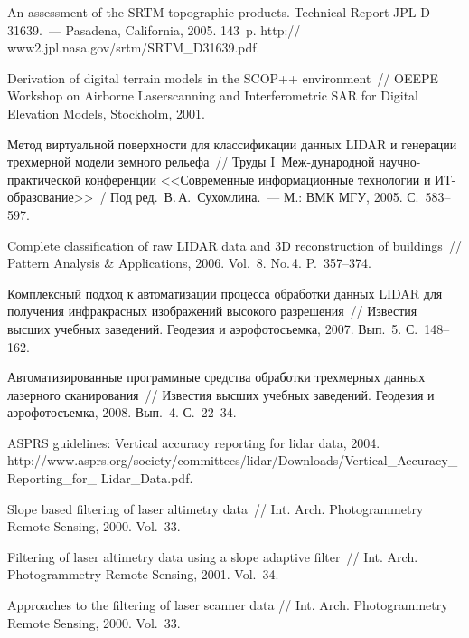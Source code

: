 \begin{multicols}{2}
{{\begin{thebibliography}{99}
An assessment of the SRTM topographic products. Technical Report JPL D-31639.~--- Pasadena, 
California, 2005. 143~p. {\sf http:// www2.jpl.nasa.gov/srtm/SRTM\_D31639.pdf}.

Derivation of digital terrain models in the SCOP++ environment~// OEEPE Workshop on 
Airborne Laserscanning and Interferometric SAR for Digital Elevation Models, Stockholm, 2001.

Метод виртуальной поверхности для классификации данных LIDAR и генерации 
трехмерной модели земного рельефа~// Труды I~Меж-\linebreak дународной 
научно-практической конференции <<Современные информационные технологии и 
ИТ-об\-ра\-зо\-вание>>~/ Под ред.\ В.\,А.~Сухомлина.~--- М.: ВМК МГУ, 2005. С.~583--597.

Complete classification of raw LIDAR data and 3D reconstruction of buildings~// Pattern 
Analysis \& Applications, 2006. Vol.~8. No.\,4. P.~357--374.

Комплексный подход к автоматизации процесса обработки данных LIDAR для получения 
инфракрасных изображений высокого разрешения~// Известия высших учебных заведений. 
Геодезия и аэрофотосъемка, 2007. Вып.~5. С.~148--162.

Автоматизированные программные средства обработки трехмерных данных лазерного 
сканирования~// Известия высших учебных заведений. Геодезия и аэрофотосъемка, 2008. 
Вып.~4. С.~22--34.

ASPRS guidelines: Vertical accuracy reporting for lidar data, 2004. {\sf 
http://www.asprs.org/society/committees/\linebreak lidar/Downloads/Vertical\_Accuracy\_Reporting\_for\_\linebreak 
Lidar\_Data.pdf}.

Slope based filtering of laser altimetry data~// Int. Arch. Photogrammetry Remote Sensing, 2000. 
Vol.~33.

Filtering of laser altimetry data using a slope adaptive filter~// Int. Arch. Photogrammetry Remote 
Sensing, 2001. Vol.~34.

Approaches to the filtering of laser scanner data // Int. Arch. Photogrammetry Remote Sensing, 2000. 
Vol.~33.


\end{thebibliography}}}
\end{multicols}
